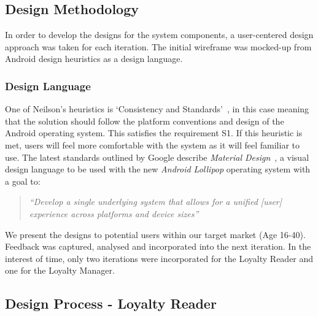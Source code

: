 \subsection{Design Methodology}
In order to develop the designs for the system components, a user-centered design\cite{usercentereddesign} approach was taken for each iteration. The initial wireframe was mocked-up from Android design heuristics as a design language.
\subsubsection{Design Language}
One of Neilson's heuristics is `Consistency and Standards'~\cite{jakob}, in this case meaning that the solution should follow the platform conventions and design of the Android operating system. This satisfies the requirement S1. If this heuristic is met, users will feel more comfortable with the system as it will feel familiar to use. The latest standards outlined by Google describe \emph{Material Design}~\cite{materialDesign}, a visual design language to be used with the new \emph{Android Lollipop} operating system with a goal to:
\begin{quote}
    \textit{``Develop a single underlying system that allows for a unified [user] experience across platforms and device sizes''}~\cite[Introduction]{materialDesign}
\end{quote}

We present the designs to potential users within our target market (Age 16-40). Feedback was captured, analysed and incorporated into the next iteration. In the interest of time, only two iterations were incorporated for the Loyalty Reader and one for the Loyalty Manager.

\newpage{}
\subsection{Design Process - Loyalty Reader}
